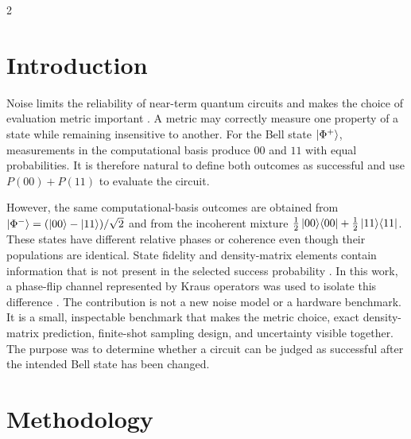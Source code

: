 \documentclass[a4paper,10pt]{article}
\begin{document}
\begin{multicols}{2}
\raggedcolumns

\section*{Introduction}
Noise limits the reliability of near-term quantum circuits and makes the
choice of evaluation metric important \cite{preskill2018nisq}.  A metric may
correctly measure one property of a state while remaining insensitive to
another.  For the Bell state $\ket{\Phi^+}$, measurements in the computational
basis produce $00$ and $11$ with equal probabilities.  It is therefore natural
to define both outcomes as successful and use $P(00)+P(11)$ to evaluate the
circuit.

However, the same computational-basis outcomes are obtained from
$\ket{\Phi^-}=(\ket{00}-\ket{11})/\sqrt{2}$ and from the incoherent mixture
$\tfrac12\ket{00}\!\bra{00}+\tfrac12\ket{11}\!\bra{11}$.  These states have
different relative phases or coherence even though their populations are
identical.  State fidelity and density-matrix elements contain information
that is not present in the selected success probability
\cite{nielsenchuang2010}.  In this work, a phase-flip channel represented by
Kraus operators was used to isolate this difference
\cite{wood2015tensor}.  The contribution is not a new noise model or a
hardware benchmark.  It is a small, inspectable benchmark that makes the
metric choice, exact density-matrix prediction, finite-shot sampling design,
and uncertainty visible together.  The purpose was to determine whether a
circuit can be judged as successful after the intended Bell state has been
changed.

\section*{Methodology}

\end{multicols}
\end{document}
